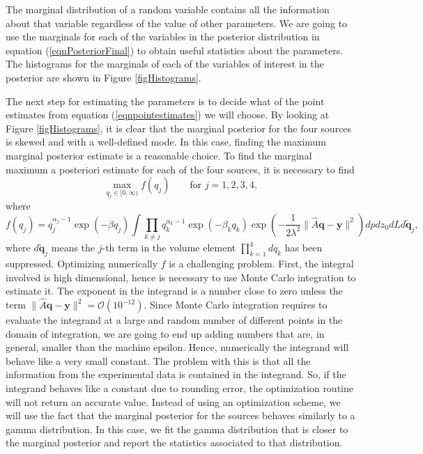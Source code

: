 \documentclass[12pt]{book}
\newcommand{\q}{\textbf{q}}
\newcommand{\y}{\textbf{y}}
\begin{document}
The marginal distribution of a random variable contains all the information about
that variable regardless of the value of other parameters. We are going
to use the marginals for each of the variables in the posterior distribution
in equation (\ref{eqnPosteriorFinal}) to obtain useful statistics about the 
parameters.
The histograms
for the   marginals  of each of the variables of interest in the posterior are shown
in Figure \ref{figHistograms}. 






The next step for estimating the parameters is to decide what of the point estimates from equation (\ref{eqnpointestimates})
we will choose. By looking at Figure \ref{figHistograms},
it is clear that the  marginal posterior for the four sources is skewed and with a well-defined mode.
In this case, finding the maximum marginal posterior estimate is a reasonable choice. 
To find the  marginal maximum a posteriori estimate for  each of the four sources, it is
necessary to find
\begin{equation*}
\max_{q_{j}\in [0,\infty)}f(q_{j})\qquad\text{for } j=1,2,3,4,
\end{equation*}
where
\begin{equation*}
f(q_{j})=q_{j}^{\alpha_{j}-1}\exp(-\beta q_{j})\int \prod_{k\neq j}q_{k}^{\alpha_{k}-1}\exp(-\beta_{k}q_{k})
\exp\left(-\frac{1}{2\lambda^{2}}\|\widehat{A}\q-\y\|^{2}\right)dpdz_{0}dLd\tilde{\q}_{j},
\end{equation*}
where $d\tilde{\q}_{j}$ means the $j$-th term in the volume element $\prod_{k=1}^{4}dq_{k}$ has been suppressed.
Optimizing numerically $f$ is a challenging problem. 
First, the integral involved is high dimensional,
hence is necessary to use Monte Carlo integration to estimate it.  
The exponent in the integrand is a number close to zero
unless the term $\|\widehat{A}\q-\y\|^{2}=\mathcal{O}(10^{-12})$. 
Since Monte Carlo integration requires to evaluate the integrand
at a large and random number of different points in the domain of integration, we are going
to end up adding numbers that are, in general, smaller than the machine epsilon. 
Hence, numerically
the integrand will behave like a very small constant. The problem with this is that
all the information from the experimental data is contained in the integrand. So,
if the integrand behaves like a constant due to rounding error, the optimization
routine will not return an accurate value. Instead of using an optimization scheme, 
we will use the fact that the marginal 
posterior for the sources behaves similarly to a gamma distribution. In this case, we 
fit the gamma distribution that is closer to the marginal posterior and report
the statistics associated to that distribution. 
\end{document}
